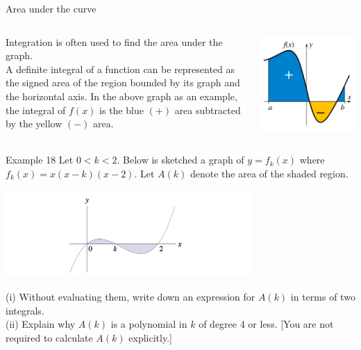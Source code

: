 \documentclass{beamer}
\begin{document}
\begin{frame}{Area under the curve}
\begin{columns}
    \begin{column}{0.5\textwidth}
    Integration is often used to find the area under the graph.\\
    A definite integral of a function can be represented as the signed area of the region bounded by its graph and the horizontal axis. In the above graph as an example, the integral of $f(x)$ is the blue $(+)$ area subtracted by the yellow $(-)$ area.
    \end{column}
    \begin{column}{0.5\textwidth}
\includegraphics[width=\textwidth]{Example/assets/4.png}  
    \end{column}
\end{columns}
\end{frame}

\begin{frame}{Example 18}
Let $0<k<2$. Below is sketched a graph of $y=f_k(x)$ where $f_k(x)=x(x-k)(x-2)$. Let $A(k)$ denote the area of the shaded region.\\
\begin{center}
 \includegraphics[width=0.7\textwidth]{Example/assets/3.png}   
\end{center}
(i) Without evaluating them, write down an expression for $A(k)$ in terms of two integrals.\\
(ii) Explain why $A(k)$ is a polynomial in $k$ of degree 4 or less. [You are not required to calculate $A(k)$ explicitly.]
\end{frame}
\end{document}
